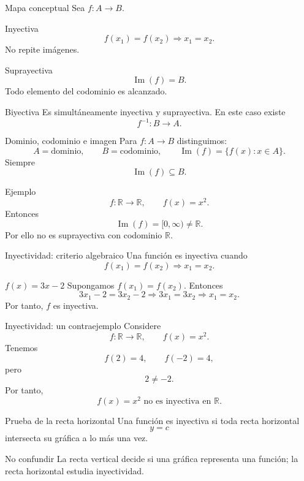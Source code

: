 \documentclass[aspectratio=169,10pt]{beamer}
\begin{document}
\begin{frame}{Mapa conceptual}
Sea $f:A\to B$.
\begin{block}{Inyectiva}
\[
f(x_1)=f(x_2)\Longrightarrow x_1=x_2.
\]
No repite imágenes.
\end{block}
\begin{block}{Suprayectiva}
\[
\operatorname{Im}(f)=B.
\]
Todo elemento del codominio es alcanzado.
\end{block}
\begin{block}{Biyectiva}
Es simultáneamente inyectiva y suprayectiva. En este caso existe
\[
f^{-1}:B\to A.
\]
\end{block}
\end{frame}

\begin{frame}{Dominio, codominio e imagen}
Para $f:A\to B$ distinguimos:
\[
A=\text{dominio},\qquad B=\text{codominio},\qquad
\operatorname{Im}(f)=\{f(x):x\in A\}.
\]
Siempre
\[
\operatorname{Im}(f)\subseteq B.
\]
\begin{exampleblock}{Ejemplo}
\[
f:\mathbb R\to\mathbb R,\qquad f(x)=x^2.
\]
Entonces
\[
\operatorname{Im}(f)=[0,\infty)\neq\mathbb R.
\]
Por ello no es suprayectiva con codominio $\mathbb R$.
\end{exampleblock}
\end{frame}

\begin{frame}{Inyectividad: criterio algebraico}
Una función es inyectiva cuando
\[
f(x_1)=f(x_2)\Longrightarrow x_1=x_2.
\]
\begin{exampleblock}{$f(x)=3x-2$}
Supongamos $f(x_1)=f(x_2)$. Entonces
\[
3x_1-2=3x_2-2
\Longrightarrow 3x_1=3x_2
\Longrightarrow x_1=x_2.
\]
Por tanto, $f$ es inyectiva.
\end{exampleblock}
\end{frame}

\begin{frame}{Inyectividad: un contraejemplo}
Considere
\[
f:\mathbb R\to\mathbb R,\qquad f(x)=x^2.
\]
Tenemos
\[
f(2)=4,\qquad f(-2)=4,
\]
pero
\[
2\neq -2.
\]
Por tanto,
\[
\boxed{f(x)=x^2\text{ no es inyectiva en }\mathbb R.}
\]
\end{frame}

\begin{frame}{Prueba de la recta horizontal}
Una función es inyectiva si toda recta horizontal
\[
y=c
\]
intersecta su gráfica a lo más una vez.
\begin{alertblock}{No confundir}
La recta vertical decide si una gráfica representa una función; la recta horizontal estudia inyectividad.
\end{alertblock}
\end{frame}
\end{document}
